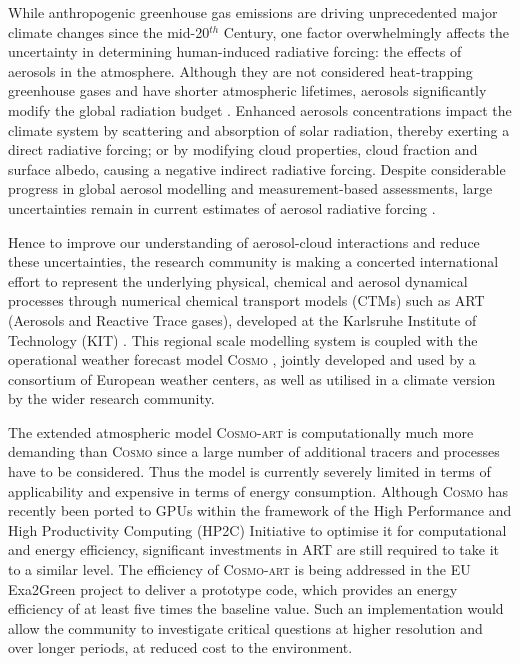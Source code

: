 While anthropogenic greenhouse gas emissions are driving unprecedented
major  climate  changes  since   the  mid-20$^{th}$  Century,  one  factor
overwhelmingly  affects  the  uncertainty  in  determining  human-induced
radiative  forcing:  the  effects   of  aerosols  in  the  atmosphere.
Although they  are not considered  heat-trapping greenhouse  gases and
have  shorter  atmospheric lifetimes,  aerosols  significantly modify  the
global   radiation   budget   \citep{IPCC-2013}.   Enhanced   aerosols
concentrations impact the climate  system by scattering and absorption
of solar radiation, thereby exerting a direct radiative forcing; or by
modifying cloud  properties,  cloud  fraction and  surface
albedo,  causing  a  negative  indirect  radiative  forcing.   Despite
considerable  progress in  global aerosol  modelling \citep{Mann-2013}
and  measurement-based  assessments,  large  uncertainties  remain  in
current  estimates  of  aerosol radiative  forcing  \citep{Myhre-2013,
IPCC-2013,  Lee-2013,   Randles-2013,  Rosenfeld-2013,  Sherwood-2013,
Stier-2013}.

Hence to  improve our understanding of  aerosol-cloud interactions and
reduce  these  uncertainties,  the  research  community  is  making  a
concerted international  effort to represent  the underlying physical,
chemical  and aerosol dynamical  processes through  numerical chemical
transport  models (CTMs)  such  as ART  (Aerosols  and Reactive  Trace
gases),   developed   at  the   Karlsruhe   Institute  of   Technology
(KIT)  \citep{Vogel-2009,  Bangert-2011,  Knote-2013}.  This  regional
scale modelling system is coupled  with the operational  weather forecast
model  \textsc{Cosmo}  \citep{Baldauf-2011},  jointly developed and used by  a
consortium of European weather centers, as well as utilised in a climate version
by the wider research community.

The extended  atmospheric model \textsc{Cosmo-art}  is com\-put\-ationally
much  more  demanding than  \textsc{Cosmo}  since  a  large number  of
additional  tracers and  processes have  to be  considered.   Thus the
model  is currently  severely limited  in terms  of applicability  and
expensive in terms of energy consumption.  Although \textsc{Cosmo} has
recently been ported to GPUs \citep{Gysi-2014, Lapillonne-2014} within
the framework of the  High Performance and High Productivity Computing
(HP2C) Initiative  \citep{HP2C} to optimise it  for computational and
energy efficiency,  significant investments in ART  are still required
to take it  to a similar level.  The  efficiency of \textsc{Cosmo-art}
is being  addressed in the  EU Exa2Green project  \citep{EXA2GREEN} to
deliver a  prototype code, which  provides an energy efficiency  of at
least five times the  baseline value.  Such an implementation would
allow  the  community  to  investigate critical  questions  at  higher
resolution  and   over  longer  periods,   at  reduced  cost   to  the
environment.

